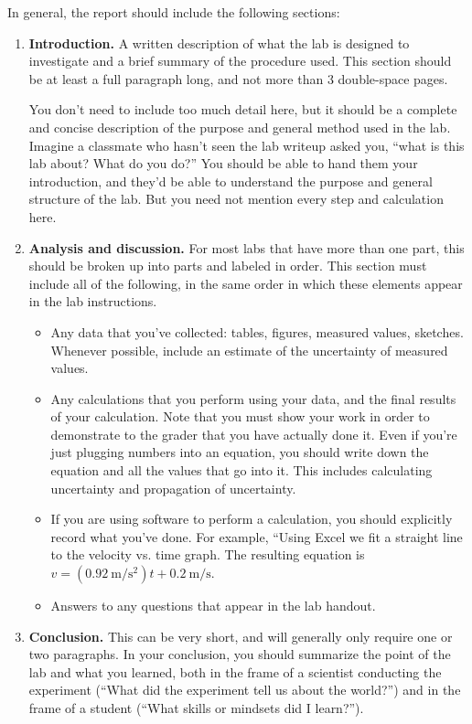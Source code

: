 In general, the report should include the following sections:
\begin{enumerate}
	\item \textbf{Introduction.} A written description of what the lab is designed to investigate and a brief summary of the procedure used. This section should be at least a full paragraph long, and not more than 3 double-space pages.
	
	You don't need to include too much detail here, but it should be a complete and concise description of the purpose and general method used in the lab. Imagine a classmate who hasn't seen the lab writeup asked you, ``what is this lab about? What do you do?'' You should be able to hand them your introduction, and they'd be able to understand the purpose and general structure of the lab. But you need not mention every step and calculation here.
	
	\item \textbf{Analysis and discussion.} For most labs that have more than one part, this should be broken up into parts and labeled in order. This section must include all of the following, in the same order in which these elements appear in the lab instructions.
	\begin{itemize}
		\item Any data that you've collected: tables, figures, measured values, sketches. Whenever possible, include an estimate of the uncertainty of measured values.
		
		\item Any calculations that you perform using your data, and the final results of your calculation. Note that you must show your work in order to demonstrate to the grader that you have actually done it. Even if you're just plugging numbers into an equation, you should write down the equation and all the values that go into it. This includes calculating uncertainty and propagation of uncertainty.
		
		\item If you are using software to perform a calculation, you should explicitly record what you've done. For example, ``Using Excel we fit a straight line to the velocity vs. time graph. The resulting equation is $v = (0.92\:\mathrm{m/s^2}) t + 0.2\:\mathrm{m/s}$.
		
		\item Answers to any questions that appear in the lab handout.
	\end{itemize}

	\item \textbf{Conclusion.} This can be very short, and will generally only require one or two paragraphs. In your conclusion, you should summarize the point of the lab and what you learned, both in the frame of a scientist conducting the experiment (``What did the experiment tell us about the world?'') and in the frame of a student (``What skills or mindsets did I learn?'').
\end{enumerate}

